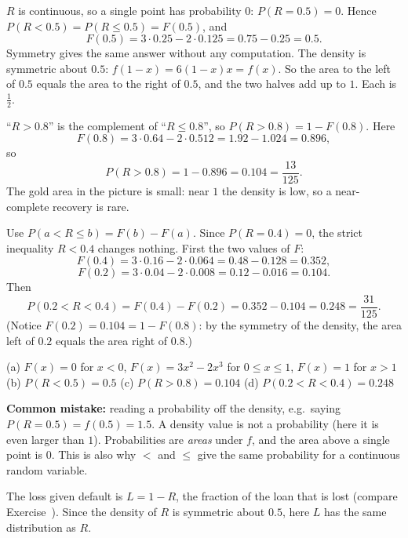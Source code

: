 \begin{solution}
	 $R$ is continuous, so a single point has probability $0$:
	$P(R=0.5)=0$. Hence $P(R<0.5)=P(R\le0.5)=F(0.5)$, and
	\[
		F(0.5)=3\cdot0.25-2\cdot0.125=0.75-0.25=0.5.
	\]
	Symmetry gives the same answer without any computation. The density is
	symmetric about $0.5$: $f(1-x)=6(1-x)x=f(x)$. So the area to the left of
	$0.5$ equals the area to the right of $0.5$, and the two halves add up to
	$1$. Each is $\frac12$.

	 ``$R>0.8$'' is the complement of ``$R\le0.8$'', so
	$P(R>0.8)=1-F(0.8)$. Here
	\[
		F(0.8)=3\cdot0.64-2\cdot0.512=1.92-1.024=0.896,
	\]
	so
	\[
		P(R>0.8)=1-0.896=0.104=\frac{13}{125}.
	\]
	The gold area in the picture is small: near $1$ the density is low, so a
	near-complete recovery is rare.

	 Use $P(a<R\le b)=F(b)-F(a)$. Since $P(R=0.4)=0$, the strict
	inequality $R<0.4$ changes nothing. First the two values of $F$:
	\[
		F(0.4)=3\cdot0.16-2\cdot0.064=0.48-0.128=0.352,
	\]
	\[
		F(0.2)=3\cdot0.04-2\cdot0.008=0.12-0.016=0.104.
	\]
	Then
	\[
		P(0.2<R<0.4)=F(0.4)-F(0.2)=0.352-0.104=0.248=\frac{31}{125}.
	\]
	(Notice $F(0.2)=0.104=1-F(0.8)$: by the symmetry of the density, the
	area left of $0.2$ equals the area right of $0.8$.)

	\begin{answer}
		(a) $F(x)=0$ for $x<0$, $F(x)=3x^2-2x^3$ for $0\le x\le1$, $F(x)=1$
		for $x>1$ \quad
		(b) $P(R<0.5)=0.5$ \quad
		(c) $P(R>0.8)=0.104$ \quad
		(d) $P(0.2<R<0.4)=0.248$
	\end{answer}
	\begin{remark}
		\textbf{Common mistake:} reading a probability off the density,
		e.g.\ saying $P(R=0.5)=f(0.5)=1.5$. A density value is not a
		probability (here it is even larger than $1$). Probabilities are
		\emph{areas} under $f$, and the area above a single point is $0$.
		This is also why $<$ and $\le$ give the same probability for a
		continuous random variable.

		The loss given default is $L=1-R$, the fraction of the loan that is
		lost (compare Exercise~). Since the density
		of $R$ is symmetric about $0.5$, here $L$ has the same distribution
		as $R$.
	\end{remark}
\end{solution}
